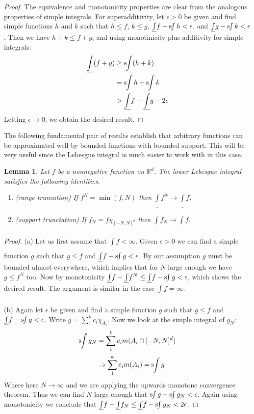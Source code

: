 \documentclass[10pt,oneside]{amsbook}
\newcommand{\RR}{{\mathbb R}}
\newcommand{\sint}{\text{s}\kern-3pt\int}
\newcommand{\lint}{\underline\int}
\theoremstyle{definition}
\theoremstyle{plain}
\newtheorem{lem}[thm]{Lemma}
\theoremstyle{definition}
\theoremstyle{remark}
\numberwithin{equation}{section}
\numberwithin{figure}{section}
\begin{document}
\begin{proof}
  The equivalence and monotonicity properties are clear from the analogous properties of simple integrals. For superadditivity, let $\epsilon>0$ be given and find simple functions $h$ and $k$ such that $h\leq f$, $k\leq g$, $\lint f-\sint h<\epsilon$, and $\lint g-\sint k<\epsilon$. Then we have $h+k\leq f+g$, and using monotinicity plus additivity for simple integrals:
  \begin{align*}
    \lint(f+g)&\geq\sint(h+k)\\
              &=\sint h+\sint k\\
              &>\lint f+\lint g-2\epsilon
  \end{align*}
  Letting $\epsilon\to0$, we obtain the desired result.
\end{proof}

The following fundamental pair of results establish that arbitrary functions can be approximated well by bounded functions with bounded support. This will be very useful since the Lebesgue integral is much easier to work with in this case.


\begin{lem}
  Let $f$ be a nonnegative function on $\RR^d$. The lower Lebesgue integral satisfies the following identities.
  \begin{enumerate}
  \item (range truncation) If $f^N=\min(f,N)$ then $\lint f^N\to\lint f$.
  \item (support trunctation) If $f_N=f\chi_{[-N,N]^d}$ then $\lint f_N\to\lint f$.
  \end{enumerate}
\end{lem}

\begin{proof}
  (a) Let us first assume that $\lint f<\infty$. Given $\epsilon>0$ we can find a simple function $g$ such that $g\leq f$ and $\lint f-\sint g<\epsilon$. By our assumption $g$ must be bounded almost everywhere, which implies that for $N$ large enough we have $g\leq f^N$ too. Now by monotonicity $\lint f-\lint f^N\leq \lint f-\sint g<\epsilon$, which shows the desired result. The argument is similar in the case $\lint f=\infty$.

  (b) Again let $\epsilon$ be given and find a simple function $g$ such that $g\leq f$ and $\lint f-\sint g<\epsilon$. Write $g=\sum_1^kc_i\chi_{A_i}$. Now we look at the simple integral of $g_N$:
  \begin{align*}
    \sint g_N&=\sum_1^kc_im(A_i\cap[-N,N]^d)\\
                    &\to\sum_1^kc_im(A_i)=\sint g
  \end{align*}
  Where here $N\to\infty$ and we are applying the upwards monotone convergence theorem. Thus we can find $N$ large enough that $\sint g-\sint g_N<\epsilon$. Again using monotonicity we conclude that $\lint f-\lint f_N\leq\lint f-\sint g_N<2\epsilon$.
\end{proof}
\end{document}
